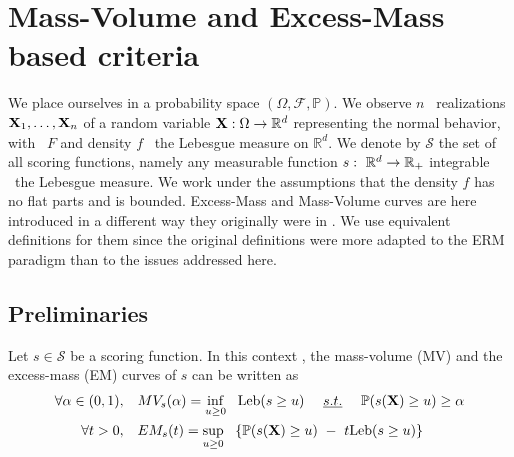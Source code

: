 \section{Mass-Volume and Excess-Mass based criteria}
\label{evaluation:background}
We place ourselves in a probability space $(\Omega, \mathcal{F}, \mathbb{P})$. We observe $n$ \iid~realizations $\mathbf X_1,\ldots,\mathbf X_n$ of a random variable $\mathbf X:\Omega \to \mathbb{R}^d$ representing the normal behavior, with \cdf~$F$ and density $f$ \wrt~the Lebesgue measure on $\mathbb{R}^d$. We denote by $\mathcal{S}$ the set of all scoring functions, namely any measurable function $s:~\mathbb{R}^d \to \mathbb{R}_+$ integrable \wrt~the Lebesgue measure.
We work under the assumptions that the density $f$ %
has no flat parts and is bounded. Excess-Mass and Mass-Volume curves are here introduced in a different way they originally were in \cite{CLEM13, AISTAT15}. We use equivalent definitions for them since %
the original definitions were more adapted to the ERM paradigm than to the issues addressed here.

\subsection{Preliminaries}
Let $s\in \mathcal{S}$ be a scoring function. In this context \cite{CLEM13,AISTAT15}, the mass-volume (MV) and the excess-mass (EM) curves of $s$ can be written as
\begin{align}
\label{evaluation:MV-def}
\forall \alpha\in (0,1),~~~& MV_s(\alpha) = \inf_{u \ge 0}~~ \text{Leb}(s \ge u) ~~~~\emph{s.t.}{}~~~~ \mathbb{P}(s(\mathbf X) \ge u) \ge \alpha\\
\label{evaluation:EM-def}
\forall t >0,~~~ & EM_s(t) = \sup_{u \ge 0}~~\left\{ \mathbb{P}(s(\mathbf X) \ge u) ~-~ t \text{Leb}(s \ge u) \right\}
\end{align}


